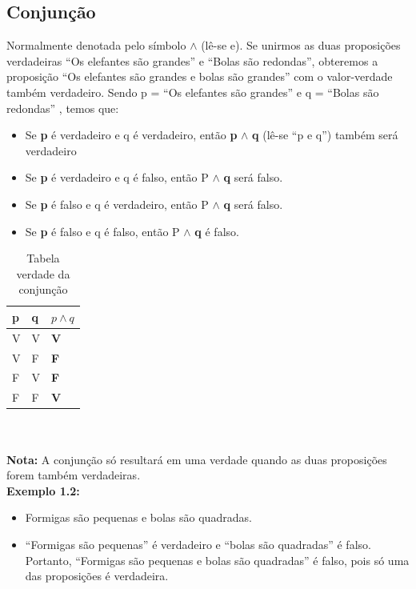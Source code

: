 \documentclass[a4paper,12pt,twoside,BCOR=10mm]{scrbook}
\begin{document}
\begin{titlepage}
\subsection{Conjunção}
Normalmente denotada pelo símbolo $\wedge$  (lê-se e). Se unirmos as duas proposições verdadeiras “Os elefantes são grandes” e “Bolas são redondas”, obteremos a proposição “Os elefantes são grandes e bolas são grandes” com o valor-verdade também verdadeiro.
Sendo p = “Os elefantes são grandes”  e  q = “Bolas são redondas” , temos que:
\begin{itemize}
\item Se \textbf{p} é verdadeiro e q é verdadeiro, então \textbf{p} $\wedge$ \textbf{q} (lê-se “p e q”) também será verdadeiro
\item Se \textbf{p} é verdadeiro e q é falso, então P $\wedge$ \textbf{q} será falso.
\item Se \textbf{p} é falso e q é verdadeiro, então P $\wedge$ \textbf{q} será falso.
\item Se \textbf{p} é falso e q é falso, então P $\wedge$ \textbf{q} é falso.
\end{itemize}

\begin{table}[htb]
\centering
\caption{Tabela verdade da conjunção}
     \sffamily \begin{tabularx}{1.0\textwidth}{ p{5cm}  p{5cm}  p{5cm} }
    \hline
   \textbf{p} \hfill & \textbf{q} \hfill & {$p \wedge q$} \\ \hline
    V & V & \textbf{V}\\
    V & F & \textbf{F}\\
    F & V & \textbf{F}\\
    F & F & \textbf{V}\\ \hline
    \end{tabularx} \normalfont
\label{table:Emissivity}
\end{table}

\\
\\
\textbf{Nota:} A conjunção só resultará em uma verdade quando as duas proposições forem também verdadeiras.
\\
\textbf{Exemplo 1.2:} 
\\	  
\begin{itemize}
\item Formigas são pequenas e bolas são quadradas.
\item “Formigas são pequenas” é verdadeiro e “bolas são quadradas” é falso. Portanto, “Formigas são pequenas e bolas são quadradas” é falso, pois só uma das proposições é verdadeira.
\end{itemize}


\end{titlepage}
\end{document}
